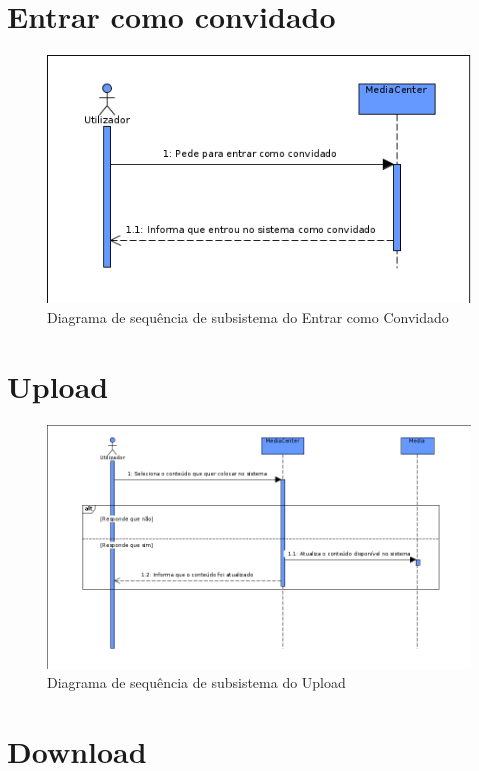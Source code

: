 \documentclass[a4paper]{report}
\begin{document}
\section{Entrar como convidado}

\begin{figure}[H]
	\centering 
    \includegraphics[width=\textwidth]{images/convidadoSub.png}  
    \caption{Diagrama de sequência de subsistema do Entrar como Convidado}
\end{figure}

\section{Upload}

\begin{figure}[H]
	\centering 
    \includegraphics[width=\textwidth]{images/uploadSub.png}  
    \caption{Diagrama de sequência de subsistema do Upload}
\end{figure}

\section{Download}
\end{document}

